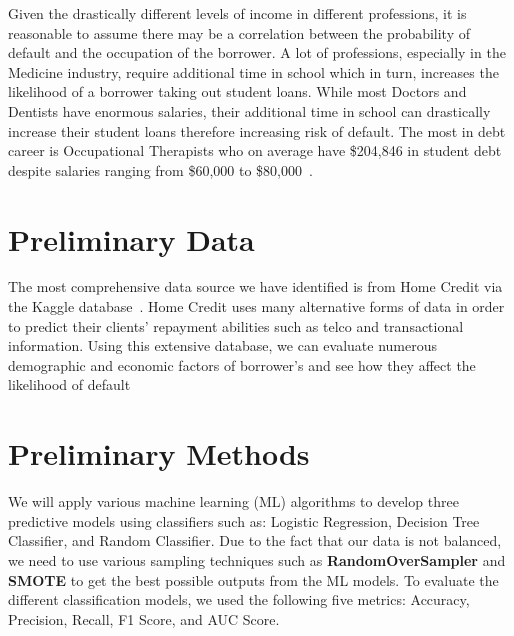 Given the drastically different levels of income in different professions, it is reasonable to assume there may be a correlation between the probability of default and the occupation of the borrower. A lot of professions, especially in the Medicine industry, require additional time in school which in turn, increases the likelihood of a borrower taking out student loans. While most Doctors and Dentists have enormous salaries, their additional time in school can drastically increase their student loans therefore increasing risk of default. The most in debt career is Occupational Therapists who on average have \$204,846 in student debt despite salaries ranging from \$60,000 to \$80,000~\cite{hornsby_2024}.


\section{Preliminary Data}

The most comprehensive data source we have identified is from Home Credit via the Kaggle database~\cite{home-credit-default-risk}. Home Credit uses many alternative forms of data in order to predict their clients' repayment abilities such as telco and transactional information. Using this extensive database, we can evaluate numerous demographic and economic factors of borrower's and see how they affect the likelihood of default

\section{Preliminary Methods}

We will apply various machine learning (ML) algorithms to develop three predictive models using classifiers such as: Logistic Regression, Decision Tree Classifier, and Random Classifier. Due to the fact that our data is not balanced, we need to use various sampling techniques such as \textbf{RandomOverSampler} and \textbf{SMOTE} to get the best possible outputs from the ML models. To evaluate the different classification models, we used the following five metrics: Accuracy, Precision, Recall, F1 Score, and AUC Score. 






